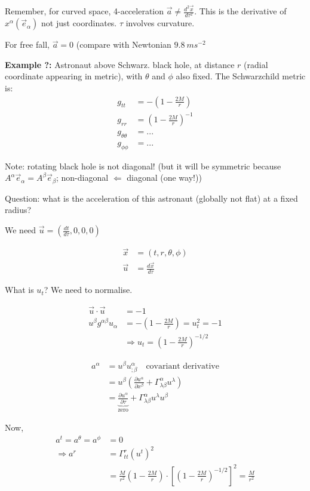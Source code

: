\documentclass[a4paper]{article} %
\newcommand{\example}[2]
{
\begin{framed}
\textbf{Example #1:} #2
\end{framed}
}
\begin{document}
Remember, for curved space, 4-acceleration $\vec{a}\neq\frac{d^2\vec{x}}{d\tau^2}$. This is the derivative of $x^{\alpha}(\vec{e}_{\alpha})$ not just coordinates. $\tau$ involves curvature.

For free fall, $\vec{a}=0$ (compare with Newtonian $\SI{9.8}{ms^{-2}}$

\example{?}{Astronaut above Schwarz. black hole, at distance $r$ (radial coordinate appearing in metric), with $\theta$ and $\phi$ also fixed. The Schwarzchild metric is:
\begin{align}
g_{tt}&=-\left(1-\frac{2M}{r}\right)\\
g_{rr}&=\left(1-\frac{2M}{r}\right)^{-1}\\
g_{\theta\theta}&=...\\
g_{\phi\phi}&=...
\end{align}

Note: rotating black hole is not diagonal! (but it will be symmetric because $A^{\alpha}\vec{e}_{\alpha}=A^{\beta}\vec{e}_{\beta}$; non-diagonal $\Leftarrow$ diagonal (one way!))

Question: what is the acceleration of this astronaut (globally not flat) at a fixed radius?

We need $\vec{u}=\left(\frac{dt}{d\tau},0,0,0\right)$

\begin{align}
\vec{x}&=(t,r,\theta,\phi)\\
\vec{u}&=\frac{d\vec{x}}{d\tau}
\end{align}

What is $u_t$? We need to normalise.

\begin{align}
\vec{u}\cdot\vec{u}&=-1\\
u^\beta g^{\alpha\beta}u_{\alpha}&=-\left(1-\frac{2M}{r}\right)=u_t^2=-1\\
&\Rightarrow u_t=\left(1-\frac{2M}{r}\right)^{-1/2}
\end{align}

\begin{align}
a^{\alpha}&=u^{\beta}u^{\alpha}_{;\beta}\quad\text{covariant derivative}\\
&=u^{\beta}\left(\frac{\partial u^{\alpha}}{\partial x^{\beta}}+\Gamma^{\alpha}_{\lambda\beta}u^{\lambda}\right)\\
&=\underbrace{\frac{\partial u^{\alpha}}{\partial\tau}}_{\text{zero}}+\Gamma^{\alpha}_{\lambda\beta}u^{\lambda}u^{\beta}
\end{align}

Now,
\begin{align}
a^t=a^{\theta}=a^{\phi}&=0\\
\Rightarrow a^{r}&=\Gamma^{r}_{tt}(u^t)^2\\
&=\frac{M}{r^2}\left(1-\frac{2M}{r}\right)\cdot\left[\left(1-\frac{2M}{r}\right)^{-1/2}\right]^2=\frac{M}{r^2}
\end{align}

}
\end{document}
